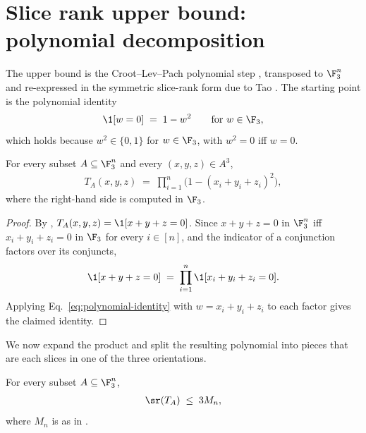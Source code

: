\section{Slice rank upper bound: polynomial decomposition}
\label{sec:slice-rank-upper-bound}

The upper bound is the Croot--Lev--Pach polynomial step \cite{CrootLevPach2017}, transposed to $\F_3^n$ and re-expressed in the symmetric slice-rank form due to Tao \cite{Tao2016blog}. The starting point is the polynomial identity
\begin{align}\label{eq:polynomial-identity}
\1[w = 0] \;=\; 1 - w^2 \qquad \text{for } w \in \F_3,
\end{align}
which holds because $w^2 \in \{0, 1\}$ for $w \in \F_3$, with $w^2 = 0$ iff $w = 0$.

\begin{lemma}\label{lem:T-polynomial}
For every subset $A \subseteq \F_3^n$ and every $(x, y, z) \in A^3$,
\begin{align*}
T_A(x, y, z) \;=\; \prod_{i=1}^n \big( 1 - (x_i + y_i + z_i)^2 \big),
\end{align*}
where the right-hand side is computed in $\F_3$.
\end{lemma}

\begin{proof}
By , $T_A(x, y, z) = \1[x + y + z = 0]$. Since $x + y + z = 0$ in $\F_3^n$ iff $x_i + y_i + z_i = 0$ in $\F_3$ for every $i \in [n]$, and the indicator of a conjunction factors over its conjuncts,
\begin{align*}
\1[x + y + z = 0] \;=\; \prod_{i=1}^n \1[x_i + y_i + z_i = 0].
\end{align*}
Applying Eq.~\eqref{eq:polynomial-identity} with $w = x_i + y_i + z_i$ to each factor gives the claimed identity.
\end{proof}

We now expand the product and split the resulting polynomial into pieces that are each slices in one of the three orientations.

\begin{lemma}\label{lem:slice-rank-upper-bound}
For every subset $A \subseteq \F_3^n$,
\begin{align*}
\sr(T_A) \;\le\; 3 M_n,
\end{align*}
where $M_n$ is as in .
\end{lemma}

